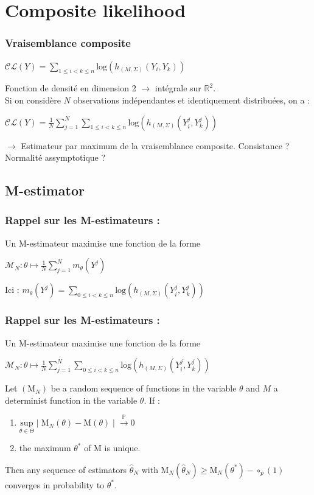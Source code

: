 \documentclass[11pt,table]{beamer}
\begin{document}
\section{Composite likelihood}

\begin{frame}
\frametitle{Vraisemblance composite \cite{varin2008composite}}
\begin{center}
$\mathcal{CL}(Y)= \sum_{1\leq i <k \leq n} \mathrm{log} (h_{(M,\Sigma)}(Y_i,Y_k))$
\end{center}
 Fonction de densité en dimension 2 $ \longrightarrow $ intégrale sur $\mathbb{R}^2$.\\
\vspace{0.5cm}
Si on considère $N$ observations indépendantes et identiquement distribuées, on a :
\begin{center}
$\mathcal{CL}(Y)= \frac{1}{N}\sum_{j=1}^N \sum_{1\leq i <k \leq n} \mathrm{log} (h_{(M,\Sigma)}(Y^j_i,Y^j_k))$
\end{center}

$\rightarrow$ Estimateur par maximum de la vraisemblance composite. Consistance ? Normalité assymptotique ?
\end{frame}
\subsection{M-estimator}
\begin{frame}
\frametitle{Rappel sur les M-estimateurs : }
Un M-estimateur maximise une fonction de la forme 
\begin{center}
$\mathcal{M}_N : \theta \mapsto \frac{1}{N} \sum_{j=1}^N m_\theta(Y^j)$
\end{center}
Ici :  $m_\theta(Y^j) = \sum_{0 \leq i < k \leq n} \mathrm{log} ( h_{(M,\Sigma)}(Y_i^j,Y_k^j) )$
\end{frame}

\begin{frame}
\frametitle{Rappel sur les M-estimateurs : }
Un M-estimateur maximise une fonction de la forme 
\begin{center}
$\mathcal{M}_N : \theta \mapsto \frac{1}{N} \sum_{j=1}^N \sum_{0 \leq i < k \leq n} \mathrm{log} ( h_{(M,\Sigma)}(Y_i^j,Y_k^j) )$
\end{center}
\begin{theorem} \label{ThMest} \cite{vaart_1998}
Let $(\mathrm{M}_N)$ be a random sequence of functions in the variable $\theta$ and $M$ a determinist function in the variable $\theta$. If :
\begin{enumerate}
\item $\underset{\theta \in \Theta}{\mathrm{sup}} \mid \mathrm{M}_N(\theta)-\mathrm{M}(\theta) \mid \overset{\mathbb{P}}{\longrightarrow} 0$
\item the maximum $\theta^\ast$ of M is unique.
\end{enumerate}
Then any sequence of estimators $\widehat{\theta}_N$ with $\mathrm{M}_N(\widehat{\theta}_N) \geq \mathrm{M}_N(\theta^\ast)-\circ_p(1)$ converges in probability to $\theta^\ast$.
\end{theorem}

\end{frame}
\end{document}
